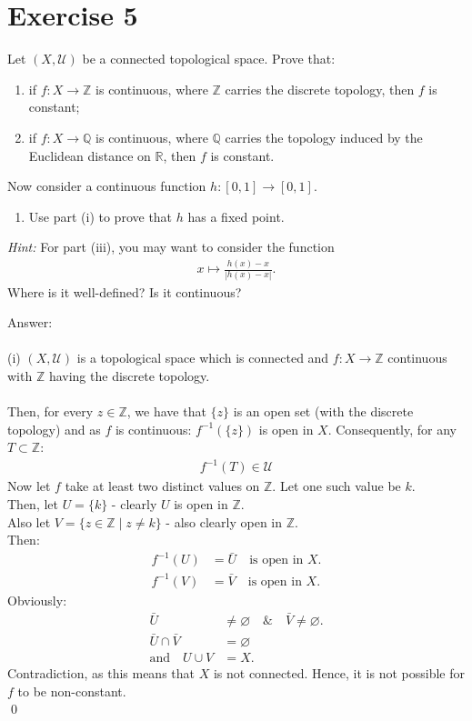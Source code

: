 \documentclass[12pt]{article}
\begin{document}
\newpage
\section*{Exercise 5}
Let $(X,\mathcal{U})$ be a connected topological space. Prove that:
\begin{enumerate}
\item[i)] if $f:X\to\mathbb{Z}$ is continuous, where $\mathbb{Z}$ carries the discrete topology, then $f$ is constant;
\item[ii)] if $f:X\to\mathbb{Q}$ is continuous, where $\mathbb{Q}$ carries the topology induced by the Euclidean distance on $\mathbb{R}$, then $f$ is constant.
\end{enumerate}
\noindent Now consider a continuous function $h:[0,1]\to[0,1]$.
\begin{enumerate}
\item[iii)] Use part (i) to prove that $h$ has a fixed point.
\end{enumerate}
\noindent\textit{Hint:} For part (iii), you may want to consider the function
\begin{align*}
x\longmapsto\frac{h(x)-x}{|h(x)-x|}.
\end{align*}
Where is it well-defined? Is it continuous?

\vspace{1cm}
\noindent
Answer:\\
\\
(i) $(X, \mathcal{U})$ is a topological space which is connected and 
$f:X\to\mathbb{Z}$ continuous with $\mathbb{Z}$ having the discrete topology.\\
\\
Then, for every $z\in\mathbb{Z}$, we have that $\{z\}$ is an open set (with the discrete topology) and
as $f$ is continuous: $f^{-1}(\{z\})$ is open in $X$.  Consequently, for any $T \subset \mathbb{Z}$:
\begin{align*}
f^{-1}(T) \in \mathcal{U}
\end{align*}
Now let $f$ take at least two distinct values on $\mathbb{Z}$. Let one such value be $k$.\\
Then, let $U=\{k\}$ - clearly $U$ is open in $\mathbb{Z}$.\\ 
Also let $V=\{z\in\mathbb{Z}\mid z \ne k\}$ - also clearly open in $\mathbb{Z}$.\\
Then:
\begin{align*}
f^{-1}(U)&=\bar{U}\quad\text{is open in }X.\\
f^{-1}(V)&=\bar{V}\quad\text{is open in }X.
\end{align*}
Obviously:
\begin{align*}
\bar{U}&\neq\varnothing\quad\&\quad\bar{V}\neq\varnothing.\\
\bar{U}\cap\bar{V}&=\varnothing\\
\text{and}\quad U\cup V&=X.
\end{align*}
Contradiction, as this means that $X$ is not connected. Hence, it is not possible for $f$ to be non-constant.\\
\qed
\end{document}
